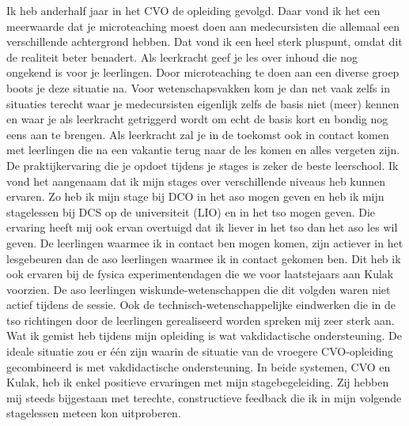 \documentclass[a4paper,12pt,twoside]{article}%
\begin{document}
Ik heb anderhalf jaar in het CVO de opleiding gevolgd. Daar vond ik het een meerwaarde dat je microteaching moest doen aan medecursisten die allemaal een verschillende achtergrond hebben. Dat vond ik een heel sterk pluspunt, omdat dit de realiteit beter benadert. Als leerkracht geef je les over inhoud die nog ongekend is voor je leerlingen. Door microteaching te doen aan een diverse groep boots je deze situatie na. Voor wetenschapsvakken kom je dan net vaak zelfs in situaties terecht waar je medecursisten eigenlijk zelfs de basis niet (meer) kennen en waar je als leerkracht getriggerd wordt om echt de basis kort en bondig nog eens aan te brengen. Als leerkracht zal je in de toekomst ook in contact komen met leerlingen die na een vakantie terug naar de les komen en alles vergeten zijn. \newline
De praktijkervaring die je opdoet tijdens je stages is zeker de beste leerschool. Ik vond het aangenaam dat ik mijn stages over verschillende niveaus heb kunnen ervaren. Zo heb ik mijn stage bij DCO in het aso mogen geven en heb ik mijn stagelessen bij DCS op de universiteit (LIO) en in het tso mogen geven. Die ervaring heeft mij ook ervan overtuigd dat ik liever in het tso dan het aso les wil geven. De leerlingen waarmee ik in contact ben mogen komen, zijn actiever in het lesgebeuren dan de aso leerlingen waarmee ik in contact gekomen ben. Dit heb ik ook ervaren bij de fysica experimentendagen die we voor laatstejaars aan Kulak voorzien. De aso leerlingen wiskunde-wetenschappen die dit volgden waren niet actief tijdens de sessie. Ook de technisch-wetenschappelijke eindwerken die in de tso richtingen door de leerlingen gerealiseerd worden spreken mij zeer sterk aan. \newline
Wat ik gemist heb tijdens mijn opleiding is wat vakdidactische ondersteuning. De ideale situatie zou er één zijn waarin de situatie van de vroegere CVO-opleiding gecombineerd is met vakdidactische ondersteuning. \newline 
In beide systemen, CVO en Kulak, heb ik enkel positieve ervaringen met mijn stagebegeleiding. Zij hebben mij steeds bijgestaan met terechte, constructieve feedback die ik in mijn volgende stagelessen meteen kon uitproberen.




	
	
	
\end{document}
